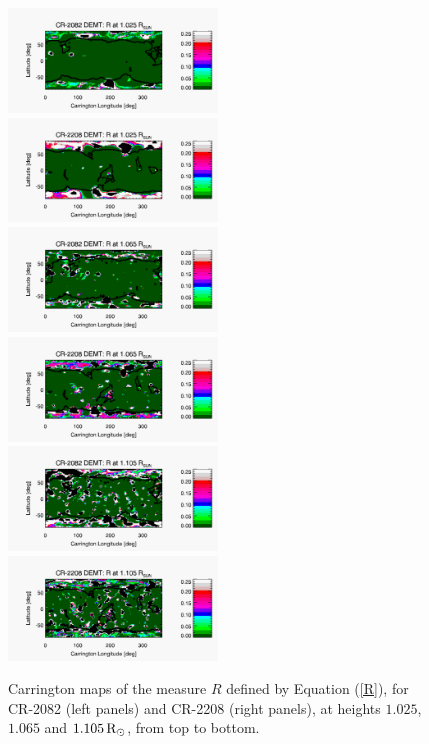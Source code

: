 \documentclass[namedreferences]{solarphysics}
\newcommand{\mrsun}{{\rm R_\odot}}
\begin{document}
\begin{article}
\begin{figure}[h!]
\begin{center}
\includegraphics[width=0.495\textwidth]{figs/map_R_CR2082_DEMT-EUVI_behind_H1-L3523_r3d_1025_Rsun.pdf}
\includegraphics[width=0.495\textwidth]{figs/map_R_CR2208_DEMT-AIA_H1_L522_r3d_1025_Rsun.pdf}
\includegraphics[width=0.495\textwidth]{figs/map_R_CR2082_DEMT-EUVI_behind_H1-L3523_r3d_1065_Rsun.pdf}
\includegraphics[width=0.495\textwidth]{figs/map_R_CR2208_DEMT-AIA_H1_L522_r3d_1065_Rsun.pdf}
\includegraphics[width=0.495\textwidth]{figs/map_R_CR2082_DEMT-EUVI_behind_H1-L3523_r3d_1105_Rsun.pdf}
\includegraphics[width=0.495\textwidth]{figs/map_R_CR2208_DEMT-AIA_H1_L522_r3d_1105_Rsun.pdf}
\caption{{Carrington maps of the measure $R$ defined by Equation (\ref{R}), for CR-2082 (left panels) and CR-2208 (right panels), at heights $1.025$, $1.065$ and $1.105\,\mrsun$, from top to bottom}. }
\label{carmaps_R_2082_2208}
\end{center}
\end{figure}


\end{article}
\end{document}
